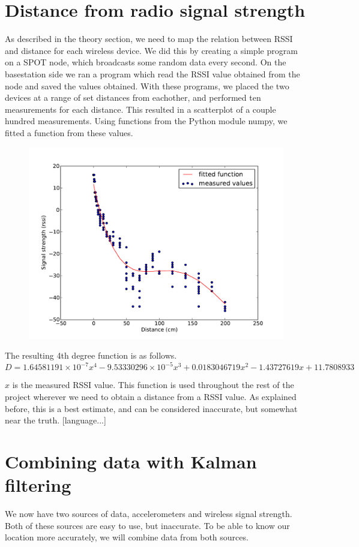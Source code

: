 \documentclass[twoside, 11pt]{uva-bachelor-thesis}
\begin{document}
  \section{Distance from radio signal strength}
  As described in the theory section, we need to map the relation between RSSI and distance for each wireless device. We did this by creating a simple program on a SPOT node, which broadcasts some random data every second. On the basestation side we ran a program which read the RSSI value obtained from the node and saved the values obtained. With these programs, we placed the two devices at a range of set distances from eachother, and performed ten measurements for each distance. This resulted in a scatterplot of a couple hundred measurements. Using functions from the Python module numpy, we fitted a function from these values. 
  \begin{figure}[H]
  \centering
  \includegraphics[width=\textwidth]{dataplot.pdf}
  \end{figure}
  The resulting 4th degree function is as follows.
  $$D = 1.64581191 \times 10^{-7} x^4 - 9.53330296 \times 10^{-5} x^3  + 0.0183046719 x^2 - 1.43727619 x + 11.7808933$$

  $x$ is the measured RSSI value. This function is used throughout the rest of the project wherever we need to obtain a distance from a RSSI value. As explained before, this is a best estimate, and can be considered inaccurate, but somewhat near the truth. [language...]
  
\section{Combining data with Kalman filtering}
We now have two sources of data, accelerometers and wireless signal strength. Both of these sources are easy to use, but inaccurate. To be able to know our location more accurately, we will combine data from both sources. 
\end{document}
